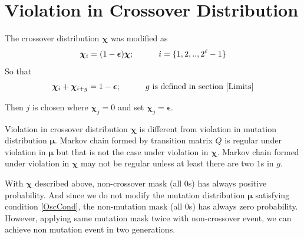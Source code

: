 \section{Violation in Crossover Distribution}
The crossover distribution $\bm{\chi}$ was modified as
\[
\bm{\chi}_i = (1-\bm{\epsilon}) \bm{\chi} ; \hspace{30pt} i = \{1, 2,.., 2^{\ell}-1\} 
\]
So that 
\[
\bm{\chi}_i + \bm{\chi}_{i+g} = 1-\bm{\epsilon} ; \hspace{30pt} g \text{ is defined in  section } \ref{Limits}
\]

Then $j$ is chosen where $\bm{\chi}_j = 0$ and set $\bm{\chi}_j = \bm{\epsilon}$. 

Violation in crossover distribution $\bm{\chi}$ is different from violation in mutation distribution $\bm{\mu}$. 
Markov chain formed by transition matrix $Q$ is regular under violation in $\bm{\mu}$ but that is not the case under violation in  $\bm{\chi}$. 
Markov chain formed under violation in $\bm{\chi}$ may not be regular unless at least there are two $1$s in $g$.

With $\bm{\chi}$ described above, non-crossover mask (all 0s) has always positive probability. 
And since we do not modify the mutation distribution $\bm{\mu}$ satisfying condition \ref{OscCond}, 
the non-mutation mask (all 0s) has always zero probability. 
However, applying same mutation mask twice with non-crossover event, 
we can achieve non mutation event in two generations. 

% 
% 


